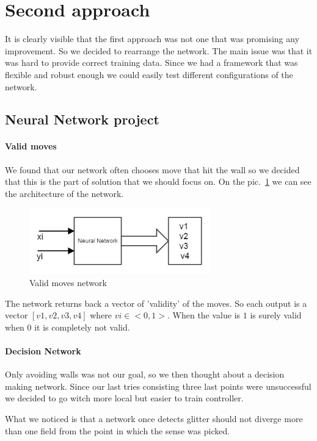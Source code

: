 \documentclass[a4paper]{article}
\begin{document}
\section{Second approach}
	It is clearly visible that the first approach was not one that was promising any improvement. So we decided to rearrange the network. The main issue was that it was hard to provide correct training data. Since we had a framework that was flexible and robust enough we could easily test different configurations of the network.
\subsection{Neural Network project}
\paragraph{Valid moves}
	We found that our network often chooses move that hit the wall so we decided that this is the part of solution that we should focus on. On the pic.~\ref{pic:validMoves} we can see the architecture of the network.

\begin{figure}[!h]
		\centering	
		\includegraphics[width=0.7\textwidth]{pic/validMoves.jpg}
		\caption{Valid moves network}
		\label{pic:validMoves}
	\end{figure}
	
	The network returns back a vector of 'validity' of the moves. So each output is a vector $[v1,v2,v3,v4]$ where $vi\in <0,1>$. When the value is $1$ is surely valid when $0$ it is completely not valid.	
\paragraph{Decision Network}
Only avoiding walls was not our goal, so we then thought about a decision making network. Since our last tries consisting three last points were unsuccessful we decided to go witch more local but easier to train controller.

What we noticed is that a network once detects glitter should not diverge more than one field from the point in which the sense was picked.
\end{document}
